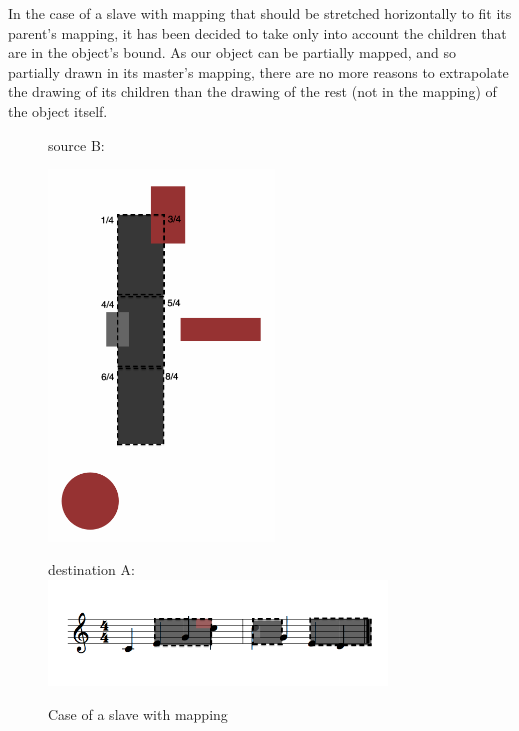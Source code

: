 \documentclass[a4paper]{article}
\begin{document}
In the case of a slave with mapping that should be stretched horizontally to fit its parent's mapping, it has been decided to take only into account the children that are in the object's bound.
As our object can be partially mapped, and so partially drawn in its master's mapping, there are no more reasons to extrapolate the drawing of its children than the drawing of the rest (not in the mapping) of the object itself.

\begin{figure}[h]
\begin{center}
\begin{multicols}{2}
source B:

\includegraphics[width=6cm]{img/stretchB.png} 

\columnbreak
destination A: 
\vspace{10cm}
\includegraphics[width=9cm]{img/stretchA.png}

\end{multicols}
\caption{Case of a slave with mapping}
\label{fig:mapping}
\end{center}
\end{figure}




\end{document}
